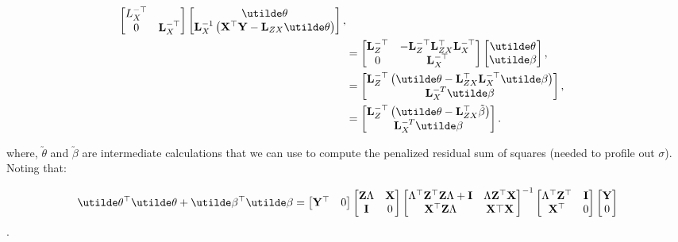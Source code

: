 \documentclass[10pt]{article}
\begin{document}
\begin{align*}
\begin{bmatrix}
{  L}_X^{-\top} \\
0 & {\bf L}_X^{-\top}
\end{bmatrix}
\begin{bmatrix}
\utilde\theta \\
{\bf L}_X^{-1}\left({\bf X}^\top{\bf Y} - {\bf L}_{ZX}\utilde\theta\right)
\end{bmatrix}, \\
%
& = \begin{bmatrix}
{\bf L}_Z^{-\top} & -{\bf L}_Z^{-\top}{\bf L}_{ZX}^\top{\bf
  L}_X^{-\top} \\
0 & {\bf L}_X^{-\top}
\end{bmatrix}
\begin{bmatrix}
\utilde\theta \\
\utilde\beta
\end{bmatrix}, \\
%
& = \begin{bmatrix}
{\bf L}_Z^{-\top}\left(\utilde\theta-{\bf L}_{ZX}^\top{\bf
    L}_X^{-\top}\utilde\beta\right) \\
{\bf L}_X^{-T}\utilde\beta
\end{bmatrix}, \\
& = \begin{bmatrix}
{\bf L}_Z^{-\top}\left(\utilde\theta-{\bf L}_{ZX}^\top\tilde{\beta}\right) \\
{\bf L}_X^{-T}\utilde\beta
\end{bmatrix}. \\
\end{align*}

\noindent where, $\utilde\theta$ and $\utilde\beta$ are intermediate
calculations that we can use to compute the penalized residual sum of
squares (needed to profile out $\sigma$). Noting that:

\begin{equation*}
\utilde\theta^\top\utilde\theta +
\utilde\beta^\top\utilde\beta =
\begin{bmatrix}{\bf Y}^\top & 0 \end{bmatrix}
\begin{bmatrix}{\bf Z}\Lambda & {\bf X} \\ {\bf I} & 0\end{bmatrix}
\begin{bmatrix}\Lambda^\top {\bf Z}^\top {\bf Z}\Lambda + {\bf I} &
  \Lambda{\bf Z}^\top{\bf X} \\
{\bf X}^\top{\bf Z}\Lambda & {\bf X}\top{\bf X}
\end{bmatrix}^{-1}
\begin{bmatrix}\Lambda^\top{\bf Z}^\top & {\bf I} \\ {\bf X}^\top &
  0 \end{bmatrix}
\begin{bmatrix} {\bf Y} \\ 0\end{bmatrix}
\end{equation*}.
\end{document}
